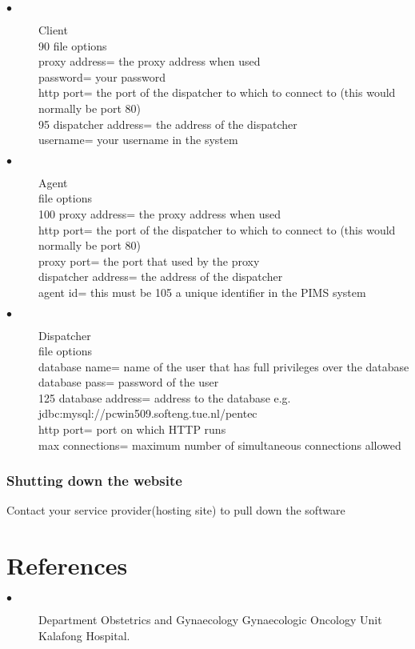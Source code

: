 \documentclass[a4paper]{article}
\begin{document}
\begin{description}
\item[$\bullet$]Client\\
90 file options\\
proxy address= the proxy address when used \\
password= your password \\
http port= the port of the dispatcher to which to connect to (this would normally be port
80) \\
95 dispatcher address= the address of the dispatcher \\
username= your username in the system \\


\item[$\bullet$]Agent\\
file options\\
100 proxy address= the proxy address when used \\
http port= the port of the dispatcher to which to connect to (this would normally be port
80) \\
proxy port= the port that used by the proxy \\
dispatcher address= the address of the dispatcher \\
agent id= this must be 105 a unique identifier in the PIMS system \\

\item[$\bullet$]Dispatcher\\
file options\\
database name= name of the user that has full privileges over the database \\
database pass= password of the user \\
125 database address= address to the database e.g. jdbc:mysql://pcwin509.softeng.tue.nl/pentec \\
http port= port on which HTTP runs \\
max connections= maximum number of simultaneous connections allowed \\

\end{description}

\subsubsection{Shutting down the website}
Contact your service provider(hosting site) to pull down the software


\section{References}
\begin{description}
\item[$\bullet$] Department Obstetrics and Gynaecology Gynaecologic Oncology Unit Kalafong Hospital.
\end{description}
\end{document}

